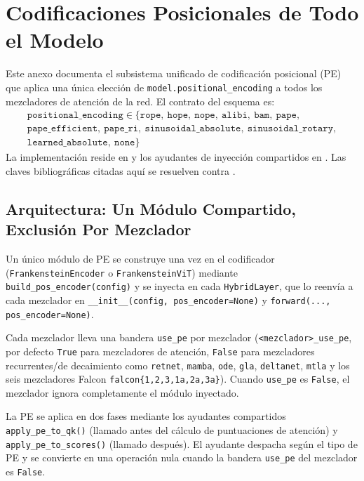 \section{Codificaciones Posicionales de Todo el Modelo}
\label{sec:annex-codificaciones-posicionales}

Este anexo documenta el subsistema unificado de codificación posicional
(PE) que aplica una única elección de \texttt{model.positional\_encoding}
a todos los mezcladores de atención de la red. El contrato del esquema es:
\[
\begin{gathered}
\texttt{positional\_encoding} \in \{\texttt{rope},\ \texttt{hope},\ \texttt{nope},\ \texttt{alibi},\ \texttt{bam},\ \texttt{pape},\\
\texttt{pape\_efficient},\ \texttt{pape\_ri},\ \texttt{sinusoidal\_absolute},\ \texttt{sinusoidal\_rotary},\\
\texttt{learned\_absolute},\ \texttt{none}\}
\end{gathered}
\]
La implementación reside en  y los
ayudantes de inyección compartidos en
. Las claves bibliográficas citadas
aquí se resuelven contra .

\subsection{Arquitectura: Un Módulo Compartido, Exclusión Por Mezclador}

Un único módulo de PE se construye una vez en el codificador
(\texttt{FrankensteinEncoder} o \texttt{FrankensteinViT}) mediante
\texttt{build\_pos\_encoder(config)} y se inyecta en cada
\texttt{HybridLayer}, que lo reenvía a cada mezclador en
\texttt{\_\_init\_\_(config, pos\_encoder=None)} y
\texttt{forward(..., pos\_encoder=None)}.

Cada mezclador lleva una bandera \texttt{use\_pe} por mezclador
(\texttt{<mezclador>\_use\_pe}, por defecto \texttt{True} para
mezcladores de atención, \texttt{False} para mezcladores
recurrentes/de decaimiento como \texttt{retnet}, \texttt{mamba},
\texttt{ode}, \texttt{gla}, \texttt{deltanet},
\texttt{mtla} y los seis mezcladores Falcon
\texttt{falcon\{1,2,3,1a,2a,3a\}}). Cuando \texttt{use\_pe} es \texttt{False}, el
mezclador ignora completamente el módulo inyectado.

La PE se aplica en dos fases mediante los ayudantes compartidos
\texttt{apply\_pe\_to\_qk()} (llamado antes del cálculo de puntuaciones de
atención) y \texttt{apply\_pe\_to\_scores()} (llamado después). El
ayudante despacha según el tipo de PE y se convierte en una operación
nula cuando la bandera \texttt{use\_pe} del mezclador es \texttt{False}.


